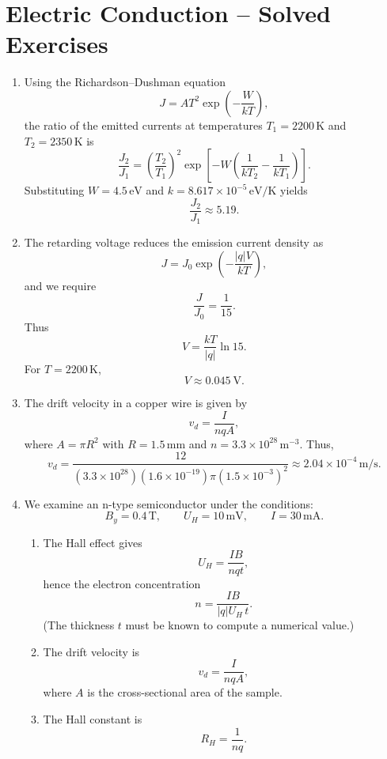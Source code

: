 \documentclass[a4paper,12pt]{article}
\begin{document}
\section*{Electric Conduction – Solved Exercises}

\begin{enumerate}

\item 
Using the Richardson--Dushman equation
\[
J = A T^{2} \exp\!\left(-\frac{W}{k T}\right),
\]
the ratio of the emitted currents at temperatures $T_1 = 2200\,\text{K}$ and $T_2 = 2350\,\text{K}$ is
\[
\frac{J_2}{J_1}
= \left(\frac{T_2}{T_1}\right)^{2}
\exp\!\left[
- W \left(\frac{1}{kT_2} - \frac{1}{kT_1}\right)
\right].
\]
Substituting $W = 4.5\,\text{eV}$ and $k = 8.617 \times 10^{-5}\,\text{eV/K}$ yields
\[
\frac{J_2}{J_1} \approx 5.19.
\]

\item 
The retarding voltage reduces the emission current density as
\[
J = J_0 \exp\!\left(-\frac{|q|V}{kT}\right),
\]
and we require
\[
\frac{J}{J_0} = \frac{1}{15}.
\]
Thus
\[
V = \frac{kT}{|q|} \ln 15.
\]
For $T = 2200\,\text{K}$,
\[
V \approx 0.045\ \text{V}.
\]

\item 
The drift velocity in a copper wire is given by
\[
v_d = \frac{I}{n q A},
\]
where $A = \pi R^{2}$ with $R = 1.5\,\text{mm}$ and $n = 3.3 \times 10^{28}\,\text{m}^{-3}$.
Thus,
\[
v_d = \frac{12}{(3.3 \times 10^{28})(1.6 \times 10^{-19}) \pi (1.5 \times 10^{-3})^{2}}
\approx 2.04 \times 10^{-4}\,\text{m/s}.
\]

\item 
We examine an n-type semiconductor under the conditions:
\[
B_y = 0.4\,\text{T}, \qquad
U_H = 10\,\text{mV}, \qquad
I = 30\,\text{mA}.
\]

\begin{enumerate}
    \item 
    The Hall effect gives
    \[
    U_H = \frac{I B}{n q t},
    \]
    hence the electron concentration
    \[
    n = \frac{I B}{|q| U_H\, t}.
    \]
    (The thickness $t$ must be known to compute a numerical value.)

    \item 
    The drift velocity is
    \[
    v_d = \frac{I}{n q A},
    \]
    where $A$ is the cross-sectional area of the sample.

    \item 
    The Hall constant is
    \[
    R_H = \frac{1}{n q}.
    \]
\end{enumerate}

\end{enumerate}
\end{document}
